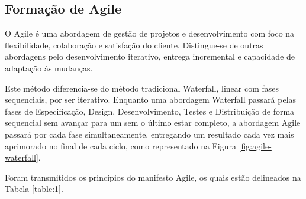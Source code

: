     \subsection{Formação de Agile}\label{subsec:agilescrum}
    
      O Agile é uma abordagem de gestão de projetos e desenvolvimento com foco na flexibilidade, colaboração e satisfação do cliente. Distingue-se de outras abordagens pelo desenvolvimento iterativo, entrega incremental e capacidade de adaptação às mudanças.

      Este método diferencia-se do método tradicional Waterfall, linear com fases sequenciais, por ser iterativo. Enquanto uma abordagem Waterfall passará pelas fases de Especificação, Design, Desenvolvimento, Testes e Distribuição de forma sequencial sem avançar para um sem o último estar completo, a abordagem Agile passará por cada fase simultaneamente, entregando um resultado cada vez mais aprimorado no final de cada ciclo, como representado na Figura \ref{fig:agile-waterfall}.

      Foram transmitidos os princípios do manifesto Agile, os quais estão delineados na Tabela \ref{table:1}.

